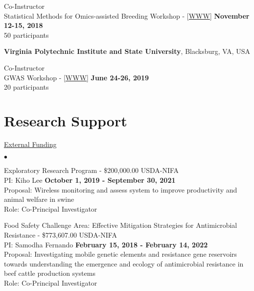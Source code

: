 \documentclass[margin,line,10pt]{res}
\newenvironment{list2}{
  \begin{list}{$\bullet$}{%
      \setlength{\itemsep}{0in}
      \setlength{\parsep}{0in} \setlength{\parskip}{0in}
      \setlength{\topsep}{0in} \setlength{\partopsep}{0in} 
      \setlength{\leftmargin}{0.2in}}}{\end{list}}
\begin{document}
\begin{resume}
Co-Instructor  \\
Statistical Methods for Omics-assisted Breeding Workshop - [\textcolor{blue}{\href{http://morotalab.org/UT2018/UT2018.html}{WWW}}]
\hfill {\bf November 12-15, 2018} \\
50 participants 


{\bf Virginia Polytechnic Institute and State University}, Blacksburg, VA, USA
\vspace{.01pt}

Co-Instructor  \\
GWAS Workshop - [\textcolor{blue}{\href{http://morotalab.org/VTGWAS2019/VTGWAS2019.html}{WWW}}]
\hfill {\bf June 24-26, 2019} \\
20 participants 


\vspace{0.5cm}
\section{\sc Research Support}
\begin{flushleft}
\hspace{0.2cm} \underline{External Funding}
\end{flushleft}

\begin{list2}


\item Exploratory Research Program - \$200,000.00  \hfill USDA-NIFA\\
  PI: Kiho Lee   \hfill \textbf{October 1, 2019 - September 30, 2021}\\
Proposal: Wireless monitoring and assess system to improve productivity and animal welfare in swine  \\
Role: Co-Principal Investigator \\


\vspace{0.5cm}


\item Food Safety Challenge Area: Effective Mitigation Strategies for Antimicrobial Resistance  - \$773,607.00  \hfill USDA-NIFA\\
PI: Samodha Fernando   \hfill \textbf{February 15, 2018 - February 14, 2022}\\
Proposal: Investigating mobile genetic elements and resistance gene reservoirs towards understanding the emergence and ecology of antimicrobial resistance in beef cattle production systems  \\
Role: Co-Principal Investigator \\


\end{list2}
\end{resume}
\end{document}
